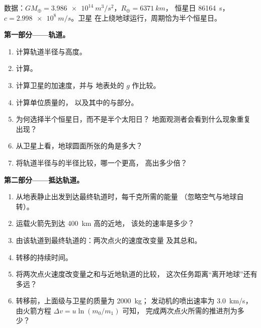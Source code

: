 \begin{problem}
\label{pb:b1:central-forces:1}
数据：$GM_\oplus = \qty{3.986e14}{m^3/s^2}$，$R_\oplus = \qty{6371}{km}$，
恒星日 \qty{86164}{s}，$c = \qty{2.998e8}{m/s}$。卫星
在上绕地球运行，周期恰为半个恒星日。

\medskip
\noindent\textbf{第一部分——轨道。}
\begin{enumerate}
  \item 计算轨道半径与高度。
  \item 计算。
  \item 计算卫星的加速度，并与
        地表处的 $g$ 作比较。
  \item 计算单位质量的，
        以及其中的与部分。
  \item 为何选择半个恒星日，而不是半个太阳日？
        地面观测者会看到什么现象重复出现？
  \item 从卫星上看，地球圆面所张的角是多大？
  \item 将轨道半径与的半径比较，哪一个更高，
        高出多少倍？
\end{enumerate}

\medskip
\noindent\textbf{第二部分——抵达轨道。}
\begin{enumerate}[resume]
  \item 从地表静止出发到达最终轨道时，每千克所需的能量
        （忽略空气与地球自转）。
  \item 运载火箭先到达 \qty{400}{km} 高的近地，
        该处的速率是多少？
  \item 由该轨道到最终轨道的：两次点火的速度改变量
        及其总和。
  \item 转移的持续时间。
  \item 将两次点火速度改变量之和与近地轨道的比较，
        这次任务距离“离开地球”还有多远？
  \item 转移前，上面级与卫星的质量为 \qty{2000}{kg}；
        发动机的喷出速率为 \qty{3.0}{km/s}，
        由火箭方程 $\Delta v = u\ln(m_0/m_1)$ 可知，
        完成两次点火所需的推进剂为多少？
\end{enumerate}


\end{problem}
